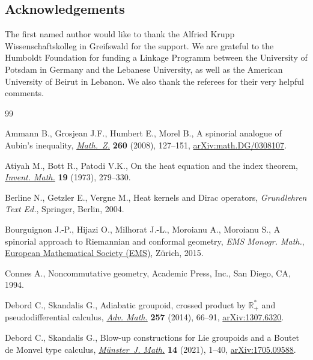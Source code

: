 \documentclass[10pt,a4paper]{amsart}
\numberwithin{equation}{section}
\theoremstyle{definition}
\begin{document}
\subsection*{Acknowledgements} The first named author would like to thank the Alfried Krupp Wissenschaftskolleg in Greifswald for the support. We are grateful to the Humboldt Foundation for funding a Linkage Programm between the University of Potsdam in Germany and the Lebanese University, as well as the American University of Beirut in Lebanon. We also thank the referees for their very helpful comments.


\begin{thebibliography}{99}
\footnotesize\itemsep=0pt

Ammann B., Grosjean J.F., Humbert E., Morel B., A spinorial analogue of
 {A}ubin's inequality, \href{https://doi.org/10.1007/s00209-007-0266-5}{\textit{Math.~Z.}} \textbf{260} (2008), 127--151,
 \href{https://arxiv.org/abs/math.DG/0308107}{arXiv:math.DG/0308107}.

Atiyah M., Bott R., Patodi V.K., On the heat equation and the index theorem,
 \href{https://doi.org/10.1007/BF01425417}{\textit{Invent. Math.}} \textbf{19} (1973), 279--330.

Berline N., Getzler E., Vergne M., Heat kernels and {D}irac operators,
 \textit{Grundlehren Text Ed.}, Springer, Berlin, 2004.

Bourguignon J.-P., Hijazi O., Milhorat J.-L., Moroianu A., Moroianu S., A
 spinorial approach to {R}iemannian and conformal geometry, \textit{EMS Monogr. Math.},
 \href{https://doi.org/10.4171/136}{European Mathematical Society (EMS)}, Z\"urich, 2015.

Connes A., Noncommutative geometry, Academic Press, Inc., San Diego, CA, 1994.

Debord C., Skandalis G., Adiabatic groupoid, crossed product by
 {$\mathbb{R}_+^\ast$} and pseudodifferential calculus, \href{https://doi.org/10.1016/j.aim.2014.02.012}{\textit{Adv. Math.}}
 \textbf{257} (2014), 66--91, \href{https://arxiv.org/abs/1307.6320}{arXiv:1307.6320}.

Debord C., Skandalis G., Blow-up constructions for {L}ie groupoids and a
 {B}outet de {M}onvel type calculus, \href{https://doi.org/10.17879/59019640550}{\textit{M\"unster~J. Math.}} \textbf{14}
 (2021), 1--40, \href{https://arxiv.org/abs/1705.09588}{arXiv:1705.09588}.


\end{thebibliography}
\end{document}
